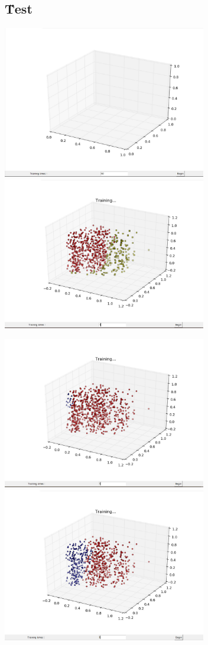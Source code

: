 \documentclass[12pt]{article}
\begin{document}
\subsection{\H Test}
\includegraphics[width=3.5in]{01.jpg}
\includegraphics[width=3.5in]{02.jpg}

\includegraphics[width=3.5in]{03.jpg}
\includegraphics[width=3.5in]{04.jpg}
\end{document}
